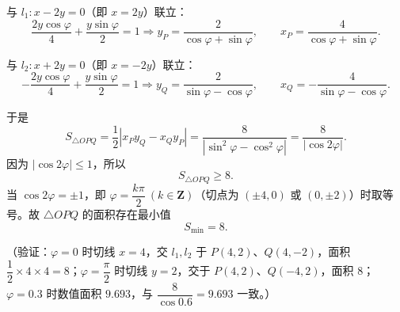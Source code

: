 \begin{answer}
与 \(l_1:x-2y=0\)（即 \(x=2y\)）联立：
\nopagebreak[4]
\[
\dfrac{2y\cos\varphi}{4}+\dfrac{y\sin\varphi}{2}=1
\Longrightarrow
y_P=\dfrac{2}{\cos\varphi+\sin\varphi},\qquad
x_P=\dfrac{4}{\cos\varphi+\sin\varphi}.
\]

与 \(l_2:x+2y=0\)（即 \(x=-2y\)）联立：
\nopagebreak[4]
\[
-\dfrac{2y\cos\varphi}{4}+\dfrac{y\sin\varphi}{2}=1
\Longrightarrow
y_Q=\dfrac{2}{\sin\varphi-\cos\varphi},\qquad
x_Q=-\dfrac{4}{\sin\varphi-\cos\varphi}.
\]

于是
\nopagebreak[4]
\[
S_{\triangle OPQ}
=\dfrac12\left|x_Py_Q-x_Qy_P\right|
=\dfrac{8}{|\sin^2\varphi-\cos^2\varphi|}
=\dfrac{8}{|\cos2\varphi|}.
\]
因为 \(|\cos2\varphi|\leqslant1\)，所以
\nopagebreak[4]
\[
S_{\triangle OPQ}\geqslant8.
\]
当 \(\cos2\varphi=\pm1\)，即 \(\varphi=\dfrac{k\pi}{2}\ (k\in\mathbf{Z})\)（切点为 \((\pm4,0)\) 或 \((0,\pm2)\)）时取等号。故 \(\triangle OPQ\) 的面积存在最小值
\nopagebreak[4]
\[
S_{\min}=8.
\]

（验证：\(\varphi=0\) 时切线 \(x=4\)，交 \(l_1,l_2\) 于 \(P(4,2)\)、\(Q(4,-2)\)，面积 \(\dfrac12\times4\times4=8\)；\(\varphi=\dfrac{\pi}{2}\) 时切线 \(y=2\)，交于 \(P(4,2)\)、\(Q(-4,2)\)，面积 \(8\)；\(\varphi=0.3\) 时数值面积 \(9.693\)，与 \(\dfrac{8}{\cos0.6}=9.693\) 一致。）



\end{answer}
